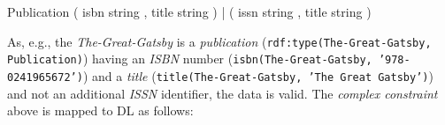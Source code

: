 \documentclass{llncs}
\newcommand{\ms}[1]{\texttt{#1}}
\newenvironment{DL}{
  \vspace{0cm}
	\begin{center}
  \begin{tabular}{r l}

}{
  \end{tabular}
	\end{center}
}
\begin{document}


\begin{ex}
Publication { 
    ( isbn string , title string ) |
    ( issn string , title string ) }
\end{ex}



As, e.g., the \emph{The-Great-Gatsby} is a \emph{publication} (\ms{rdf:type(The-Great-Gatsby, Publication)}) having an \emph{ISBN} number (\ms{isbn(The-Great-Gatsby, '978-0241965672')}) and a \emph{title} (\ms{title(The-Great-Gatsby, 'The Great Gatsby')}) and not an additional \emph{ISSN} identifier, the data is valid.
The \emph{complex constraint} above is mapped to DL as follows:

\end{document}
